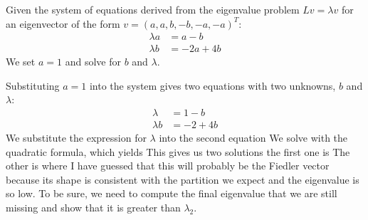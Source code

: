 Given the system of equations derived from the eigenvalue problem $Lv = \lambda v$ for an eigenvector of the form $v = (a, a, b, -b, -a, -a)^T$:
\begin{align*}
    \lambda a &= a - b \\
    \lambda b &= -2a + 4b
\end{align*}
We set $a=1$ and solve for $b$ and $\lambda$.


Substituting $a=1$ into the system gives two equations with two unknowns, $b$ and $\lambda$:
\begin{align*}
    \lambda &= 1 - b \\
    \lambda b &= -2 + 4b
\end{align*}
We substitute the expression for $\lambda$ into the second equation 
We solve with the quadratic formula, which yields
This gives us two solutions the first one is 
The other is 
where I have guessed that this will probably be the Fiedler vector because its shape is consistent with the partition we expect and the eigenvalue is so low. 
To be sure, we need to compute the final eigenvalue that we are still missing and show that it is greater than $\lambda_2$. 

